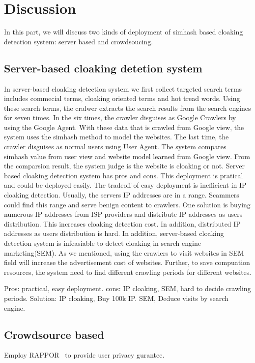 \section{Discussion}
\label{s:discussion}

In this part, we will discuss two kinds of deployment of simhash based cloaking detection system: server based and crowdsoucing.

\subsection{Server-based cloaking detetion system}
In server-based cloaking detection system
we first collect targeted search terms includes commecial terms, cloaking oriented terms and hot tread words.
Using these search terms, the cralwer extracts the search results from the search engines for seven times.
In the six times, the crawler disguises as Google Crawlers by using the Google Agent. With these
data that is crawled from Google view, the system uses the simhash method to model the websites. The last
time, the crawler disguises as normal users using User Agent. The system compares simhash value from user view and
website model learned from Google view. From the comparsion result, the system judge is the website is cloaking
or not. 
Server based cloaking detection system has pros and cons. This deployment is pratical and could be deployed
easily. The tradeoff of easy deployment is inefficient in IP cloaking detection. Usually, the servers IP addresses
are in a range. Scammers could find this range and serve benign content to crawlers. One solution is buying numerous IP addresses
from ISP providers and distribute IP addresses as users distribution. This increases cloaking detection cost. In
addition, distributed IP addresses as users distribution is hard. In addition, server-based cloaking detection system is infeasiable
to detect cloaking in search engine marketing(SEM). As we mentioned, using the crawlers to visit websites in SEM field
will increase the advertisement cost of websites. Further, to save compuation resources, the system need to find different 
crawling periods for different websites. 


Pros:	practical, easy deployment.
cons:	IP cloaking, SEM, hard to decide crawling periods. 
Solution: IP cloaking, Buy 100k IP.
SEM, Deduce visits by search engine. 

\subsection{Crowdsource based}
Employ RAPPOR~\cite{erlingsson2014rappor} to provide user privacy gurantee.

